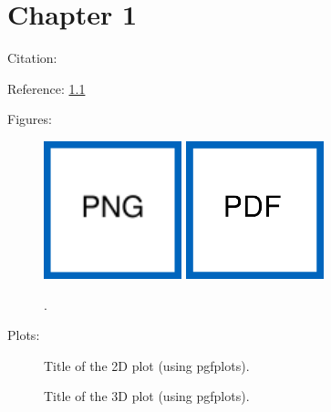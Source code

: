 \chapter{Chapter 1}%
Citation: \cite{Pfeiffer2014}\par%
Reference: \cref{fig:MyImage}\par%
Figures:\par%
\begin{figure}[htb]%
    \centering%
    \includegraphics[width=40mm]{figures/ImagePNG.png}%
    \hspace*{5mm}%
    \includegraphics[width=40mm]{figures/ImagePDF.pdf}\par%
    \begingroup%
        \resizebox{40mm}{!}{}%
    \endgroup%
    \hspace*{5mm}%
    \begingroup%
        \def\svgwidth{40mm}%
        \fontsize{25}{25}\selectfont%
    \endgroup%
    \caption{.}%
    \label{fig:MyImage}%
\end{figure}%
%
Plots:\par%
\begin{figure}[htb]%
    \centering%
    \caption{Title of the 2D plot (using pgfplots).}%
    \label{fig:PlotTwoDim}%
\end{figure}%
%
\begin{figure}[htb]%
    \centering%
    \caption{Title of the 3D plot (using pgfplots).}%
    \label{fig:PlotThreeDim}%
\end{figure}%
%
%
